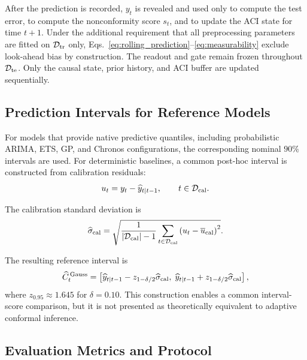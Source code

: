 \documentclass[review,number,sort&compress]{elsarticle}
\begin{document}
After the prediction is recorded, $y_t$ is revealed and used only to compute the test error, to compute the nonconformity score $s_t$, and to update the ACI state for time $t+1$.
Under the additional requirement that all preprocessing parameters are fitted
on $\mathcal{D}_{\mathrm{tr}}$ only, Eqs.~\eqref{eq:rolling_prediction}--\eqref{eq:measurability}
exclude look-ahead bias by construction.
The readout and gate remain frozen throughout $\mathcal{D}_{\mathrm{te}}$. Only the causal state,
prior history, and ACI buffer are updated sequentially.

\subsection{Prediction Intervals for Reference Models}
\label{subsec:baseline_intervals}

For models that provide native predictive quantiles, including probabilistic
ARIMA, ETS, GP, and Chronos configurations, the corresponding nominal
$90\%$ intervals are used.
For deterministic baselines, a common post-hoc interval is constructed from
calibration residuals:
\begin{equation}
    u_t
    =
    y_t-\widehat{y}_{t|t-1},
    \qquad
    t\in\mathcal{D}_{\mathrm{cal}}.
\end{equation}

The calibration standard deviation is
\begin{equation}
    \widehat{\sigma}_{\mathrm{cal}}
    =
    \sqrt{
    \frac{1}{|\mathcal{D}_{\mathrm{cal}}|-1}
    \sum_{t\in\mathcal{D}_{\mathrm{cal}}}
    \left(
    u_t-\overline{u}_{\mathrm{cal}}
    \right)^2
    }.
\end{equation}

The resulting reference interval is
\begin{equation}
    \widehat{C}^{\,\mathrm{Gauss}}_t
    =
    \left[
    \widehat{y}_{t|t-1}
    -
    z_{1-\delta/2}\widehat{\sigma}_{\mathrm{cal}},
    \;
    \widehat{y}_{t|t-1}
    +
    z_{1-\delta/2}\widehat{\sigma}_{\mathrm{cal}}
    \right],
    \label{eq:baseline_gaussian_interval}
\end{equation}
where $z_{0.95}\approx1.645$ for $\delta=0.10$.
This construction enables a common interval-score comparison, but it is not
presented as theoretically equivalent to adaptive conformal inference.

\subsection{Evaluation Metrics and Protocol}
\label{subsec:metrics}
\end{document}
